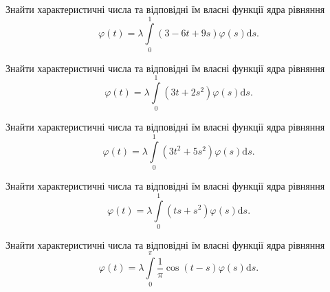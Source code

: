 \documentclass[12pt]{extarticle}
\begin{document}
\begin{Exercise}
Знайти характеристичні числа та відповідні їм власні функції ядра рівняння \[\varphi(t) = \lambda\int\limits_{0}^{1} (3-6t+9s) \varphi(s) \mathrm{d}s.\]
\end{Exercise}

\begin{Exercise}
Знайти характеристичні числа та відповідні їм власні функції ядра рівняння \[\varphi(t) = \lambda\int\limits_{0}^{1} (3t+2s^2) \varphi(s) \mathrm{d}s.\]
\end{Exercise}

\begin{Exercise}
Знайти характеристичні числа та відповідні їм власні функції ядра рівняння \[\varphi(t) = \lambda\int\limits_{0}^{1} (3t^2+5s^2) \varphi(s) \mathrm{d}s.\]
\end{Exercise}

\begin{Exercise}
Знайти характеристичні числа та відповідні їм власні функції ядра рівняння \[\varphi(t) = \lambda\int\limits_{0}^{1} (ts+s^2) \varphi(s) \mathrm{d}s.\]
\end{Exercise}

\begin{Exercise}
Знайти характеристичні числа та відповідні їм власні функції ядра рівняння \[\varphi(t) = \lambda\int\limits_{0}^{\pi} \dfrac{1}{\pi} \cos(t-s) \varphi(s) \mathrm{d}s.\]
\end{Exercise}
\end{document}
